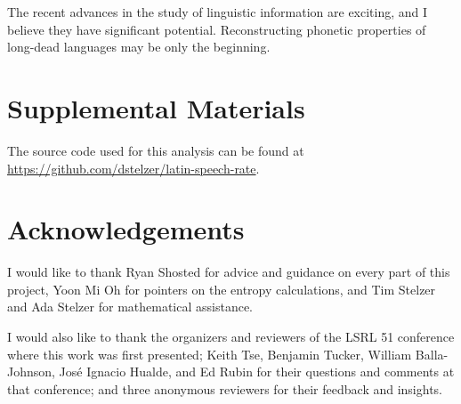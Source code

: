 \documentclass[12pt,twoside,leqno]{article} %
\begin{document}
The recent advances in the study of linguistic information are exciting, and I believe they have significant potential. Reconstructing phonetic properties of long-dead languages may be only the beginning.

\section*{Supplemental Materials}

The source code used for this analysis can be found at \url{https://github.com/dstelzer/latin-speech-rate}.

\vspace{2ex}

\section*{Acknowledgements}

I would like to thank Ryan Shosted for advice and guidance on every part of this project, Yoon Mi Oh for pointers on the entropy calculations, and Tim Stelzer and Ada Stelzer for mathematical assistance.

I would also like to thank the organizers and reviewers of the LSRL 51 conference where this work was first presented; Keith Tse, Benjamin Tucker, William Balla-Johnson, José Ignacio Hualde, and Ed Rubin for their questions and comments at that conference; and three anonymous reviewers for their feedback and insights.

\vspace{2ex}

\label{sec:refs}
\setlength{}
\printbibliography
\end{document}
